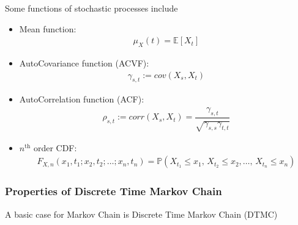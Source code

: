 Some functions of stochastic processes include
\begin{itemize}[topsep=2pt,itemsep=0pt]
    \item Mean function:
    \begin{align}
        \mu _X(t)=\mathbb{E}\left[ X_t \right]  
    \end{align}
    \item AutoCovariance function (ACVF):
    \begin{align}
        \gamma _{s,t}:=cov(X_s,X_t)
    \end{align}
    \item AutoCorrelation function (ACF):
    \begin{align}
        \rho _{s,t}:=corr(X_s,X_t)=\dfrac{\gamma _{s,t}}{\sqrt{\gamma _{s,s}\gamma _{t,t}}} 
    \end{align}
    \item $ n^\mathrm{th}  $ order CDF:
    \begin{align}
        F_{X,n}(x_1,t_1;x_2,t_2;\ldots;x_n,t_n)=\mathbb{P}\left( X_{t_1}\leq x_1,\,X_{t_2}\leq x_2,\ldots,\,X_{t_n}\leq x_n \right)  
    \end{align}
   
\end{itemize}



    
    
    
    

    


\subsubsection{Properties of Discrete Time Markov Chain}\label{SubSubSectionDTMC}
A basic case for Markov Chain is Discrete Time Markov Chain (DTMC)

